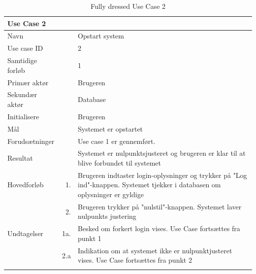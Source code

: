 \begin{longtabu} to  %
    {\large \textbf{Use Case 2}} && \\
    \toprule
    Navn &&    Opstart system\\
    Use case ID &&    2\\
    Samtidige forløb &&    1\\
    Primær aktør &&    Brugeren\\
    Sekundær aktør && Database\\
    Initialisere &&    Brugeren\\
    Mål && Systemet er opstartet\\
    Forudsætninger &&  Use case 1 er gennemført.\\
    Resultat &&    Systemet er nulpunktsjusteret og brugeren er klar til at blive forbundet til systemet\\
    \midrule
    Hovedforløb &    1. &    Brugeren indtaster login-oplysninger og trykker på "Log ind"\--knappen. Systemet tjekker i databasen om oplysninger er gyldige \\
    	&			2. & Brugeren trykker på "nulstil"\--knappen. Systemet laver nulpunkts justering  \\ \midrule
    Undtagelser &    1a. & Besked om forkert login vises. Use Case fortsættes fra punkt 1     \\ 
    	&			2.a & Indikation om at systemet ikke er nulpunktjusteret vises. Use Case fortsættes fra punkt 2 \\ \bottomrule    
\caption{Fully dressed Use Case 2}
\label{UC2}
\end{longtabu}


